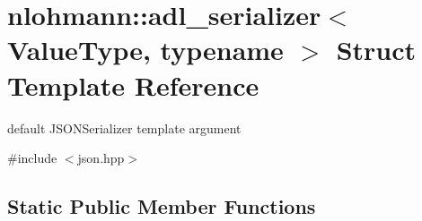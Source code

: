 \hypertarget{structnlohmann_1_1adl__serializer}{}\section{nlohmann\+:\+:adl\+\_\+serializer$<$ Value\+Type, typename $>$ Struct Template Reference}
\label{structnlohmann_1_1adl__serializer}


default J\+S\+O\+N\+Serializer template argument  




{\ttfamily \#include $<$json.\+hpp$>$}

\subsection*{Static Public Member Functions}
